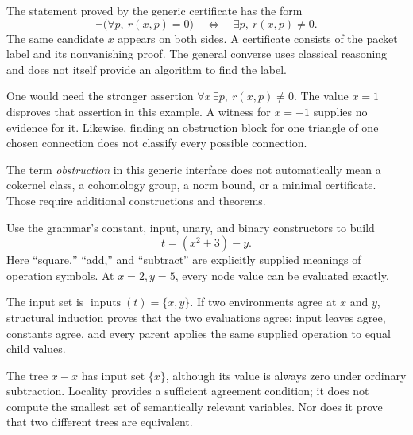 The statement proved by the generic certificate has the form
\[
\neg\bigl(\forall p,\ r(x,p)=0\bigr)
\quad\Longleftrightarrow\quad
\exists p,\ r(x,p)\ne0.
\]
The same candidate $x$ appears on both sides. A certificate consists of the packet label and its nonvanishing proof. The general converse uses classical reasoning and does not itself provide an algorithm to find the label.

One would need the stronger assertion $\forall x\,\exists p,\ r(x,p)\ne0$. The value $x=1$ disproves that assertion in this example. A witness for $x=-1$ supplies no evidence for it. Likewise, finding an obstruction block for one triangle of one chosen connection does not classify every possible connection.

The term \emph{obstruction} in this generic interface does not automatically mean a cokernel class, a cohomology group, a norm bound, or a minimal certificate. Those require additional constructions and theorems.


Use the grammar's constant, input, unary, and binary constructors to build
\[
t=(x^2+3)-y.
\]
Here ``square,'' ``add,'' and ``subtract'' are explicitly supplied meanings of operation symbols. At $x=2,y=5$, every node value can be evaluated exactly.


The input set is $\operatorname{inputs}(t)=\{x,y\}$. If two environments agree at $x$ and $y$, structural induction proves that the two evaluations agree: input leaves agree, constants agree, and every parent applies the same supplied operation to equal child values.

The tree $x-x$ has input set $\{x\}$, although its value is always zero under ordinary subtraction. Locality provides a sufficient agreement condition; it does not compute the smallest set of semantically relevant variables. Nor does it prove that two different trees are equivalent.

